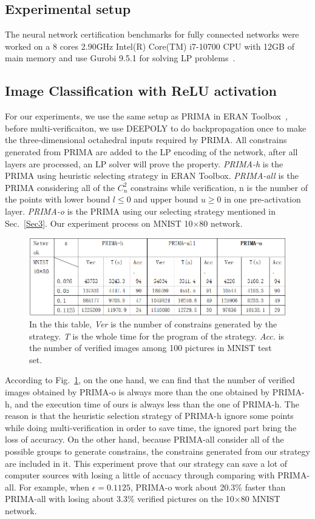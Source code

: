 \documentclass[runningheads]{llncs}
\begin{document}
\subsection{Experimental setup}
The neural network certification benchmarks for fully connected networks were worked on a 8 cores 2.90GHz Intel(R) Core(TM) i7-10700 CPU with 12GB of main memory and use Gurobi 9.5.1 for solving LP problems~\cite{ref_url3}.

\subsection{Image Classification with ReLU activation}
For our experiments, we use the same setup as PRIMA in ERAN Toolbox~\cite{ref_url4}, before multi-verificaiton, we use DEEPOLY to do backpropagation once to make the three-dimensional octahedral inputs required by PRIMA. All constrains generated from PRIMA are added to the LP encoding of the network, after all layers are processed, an LP solver will prove the property. \textit{PRIMA-h} is the PRIMA using heuristic selecting strategy in ERAN Toolbox. \textit{PRIMA-all} is the PRIMA considering all of the 
$C_{n}^{2}$ constrains while verification, n is the number of the points with lower bound $l\leq 0$ and upper bound $u\geq 0$ in one pre-activation layer. \textit{PRIMA-o} is the PRIMA using our selecting strategy mentioned in Sec.~\ref{Sec3}. Our experiment process on MNIST 10$\times $80 network.

\begin{figure}
\includegraphics[width=\textwidth]{../Fig/FigR3_1.png}
\caption{In the this table, \textit{Ver} is the number of constrains generated by the strategy. \textit{T} is the whole time for the program of the strategy. \textit{Acc.} is the number of verified images among 100 pictures in MNIST test set.} \label{table1}
\end{figure}

According to Fig.~\ref{table1}, on the one hand, we can find that the number of verified images obtained by PRIMA-o is always more than the one obtained by PRIMA-h, and the execution time of ours is always less than  the one of PRIMA-h. The reason is that the heuristic selection strategy of PRIMA-h ignore some points while doing multi-verification in order to save time, the ignored part bring the loss of accuracy. On the other hand, because PRIMA-all consider all of the possible groups to generate constrains, the constrains generated from our strategy are included in it. This experiment prove that our strategy can save a lot of computer sources with losing a little of accuacy through comparing with PRIMA-all. For example, when $\epsilon =0.1125$, PRIMA-o work about 20.3\% faster than PRIMA-all with losing about 3.3\% verified pictures on the 10$\times $80 MNIST network.
\end{document}
